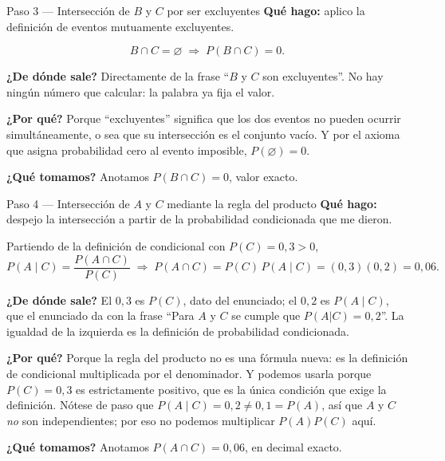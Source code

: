 \documentclass[11pt]{article}
\begin{document}
\begin{paso}{Paso 3 --- Intersección de $B$ y $C$ por ser excluyentes}
\textbf{Qué hago:} aplico la definición de eventos mutuamente excluyentes.

\[
B\cap C=\varnothing \;\Longrightarrow\; P(B\cap C)=0.
\]

\textbf{¿De dónde sale?} Directamente de la frase ``$B$ y $C$ son excluyentes''. No hay ningún número que calcular: la palabra ya fija el valor.

\textbf{¿Por qué?} Porque ``excluyentes'' significa que los dos eventos no pueden ocurrir simultáneamente, o sea que su intersección es el conjunto vacío. Y por el axioma que asigna probabilidad cero al evento imposible, $P(\varnothing)=0$.

\textbf{¿Qué tomamos?} Anotamos $P(B\cap C)=0$, valor exacto.
\end{paso}

\begin{paso}{Paso 4 --- Intersección de $A$ y $C$ mediante la regla del producto}
\textbf{Qué hago:} despejo la intersección a partir de la probabilidad condicionada que me dieron.

Partiendo de la definición de condicional con $P(C)=0{,}3>0$,
\[
P(A\mid C)=\frac{P(A\cap C)}{P(C)}
\;\Longrightarrow\;
P(A\cap C)=P(C)\,P(A\mid C)=(0{,}3)(0{,}2)=0{,}06.
\]

\textbf{¿De dónde sale?} El $0{,}3$ es $P(C)$, dato del enunciado; el $0{,}2$ es $P(A\mid C)$, que el enunciado da con la frase ``Para $A$ y $C$ se cumple que $P(A|C)=0{,}2$''. La igualdad de la izquierda es la definición de probabilidad condicionada.

\textbf{¿Por qué?} Porque la regla del producto no es una fórmula nueva: es la definición de condicional multiplicada por el denominador. Y podemos usarla porque $P(C)=0{,}3$ es estrictamente positivo, que es la única condición que exige la definición. Nótese de paso que $P(A\mid C)=0{,}2\neq 0{,}1=P(A)$, así que $A$ y $C$ \emph{no} son independientes; por eso no podemos multiplicar $P(A)P(C)$ aquí.

\textbf{¿Qué tomamos?} Anotamos $P(A\cap C)=0{,}06$, en decimal exacto.
\end{paso}
\end{document}
